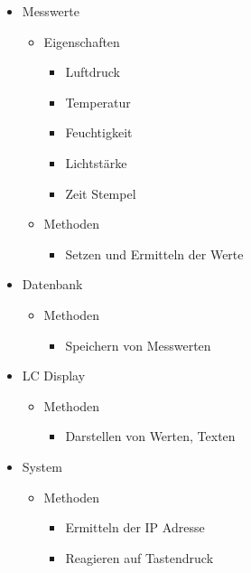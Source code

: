 \documentclass[
    10pt,
    a4paper,
]{scrartcl}
\begin{document}
\begin{itemize}
    \item Messwerte
        \begin{itemize}
            \item Eigenschaften
                \begin{itemize}
                    \item Luftdruck
                    \item Temperatur
                    \item Feuchtigkeit
                    \item Lichtstärke
                    \item Zeit Stempel
                \end{itemize}
            \item Methoden
                \begin{itemize}
                    \item Setzen und Ermitteln der Werte
                \end{itemize}
        \end{itemize}
    \item Datenbank
        \begin{itemize}
            \item Methoden
                \begin{itemize}
                    \item Speichern von Messwerten
                \end{itemize}
        \end{itemize}
    \item LC Display
        \begin{itemize}
            \item Methoden
                \begin{itemize}
                    \item Darstellen von Werten, Texten
                \end{itemize}
        \end{itemize}
    \item System
        \begin{itemize}
            \item Methoden
                \begin{itemize}
                    \item Ermitteln der IP Adresse
                    \item Reagieren auf Tastendruck
                \end{itemize}
        \end{itemize}
\end{itemize}
\end{document}
